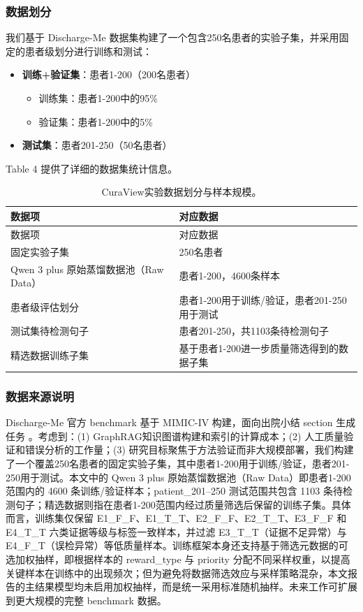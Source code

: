 \documentclass[11pt]{article}
\begin{document}
\subsubsection{数据划分}

我们基于 Discharge-Me 数据集构建了一个包含250名患者的实验子集，并采用固定的患者级划分进行训练和测试：

\begin{itemize}
\item
  \textbf{训练+验证集}：患者1-200（200名患者）

  \begin{itemize}
  \item
    训练集：患者1-200中的95\%
  \item
    验证集：患者1-200中的5\%
  \end{itemize}
\item
  \textbf{测试集}：患者201-250（50名患者）
\end{itemize}

Table 4 提供了详细的数据集统计信息。

\begin{longtable}[]{@{}ll@{}}
\caption{CuraView实验数据划分与样本规模。}\tabularnewline
\toprule\noalign{}
数据项 & 对应数据 \\
\midrule\noalign{}
\endfirsthead
\toprule\noalign{}
数据项 & 对应数据 \\
\midrule\noalign{}
\endhead
\bottomrule\noalign{}
\endlastfoot
固定实验子集 & 250名患者 \\
Qwen 3 plus 原始蒸馏数据池（Raw Data） & 患者1-200，4600条样本 \\
患者级评估划分 & 患者1-200用于训练/验证，患者201-250用于测试 \\
测试集待检测句子 & 患者201-250，共1103条待检测句子 \\
精选数据训练子集 & 基于患者1-200进一步质量筛选得到的数据子集 \\
\end{longtable}

\subsubsection{数据来源说明}

Discharge-Me 官方 benchmark 基于 MIMIC-IV 构建，面向出院小结 section 生成任务 \citep{stanfordaimi2024dischargeMe,xu2024dischargeMeSharedTask}。考虑到：(1) GraphRAG知识图谱构建和索引的计算成本；(2) 人工质量验证和错误分析的工作量；(3) 研究目标聚焦于方法验证而非大规模部署，我们构建了一个覆盖250名患者的固定实验子集，其中患者1-200用于训练/验证，患者201-250用于测试。本文中的 Qwen 3 plus 原始蒸馏数据池（Raw Data）即患者1-200范围内的 4600 条训练/验证样本；patient\_201--250 测试范围共包含 1103 条待检测句子；精选数据则指在患者1-200范围内经过质量筛选后保留的训练子集。具体而言，训练集仅保留 E1\_F\_F、E1\_T\_T、E2\_F\_F、E2\_T\_T、E3\_F\_F 和 E4\_T\_T 六类证据等级与标签一致样本，并过滤 E3\_T\_T（证据不足异常）与 E4\_F\_T（误检异常）等低质量样本。训练框架本身还支持基于筛选元数据的可选加权抽样，即根据样本的 reward\_type 与 priority 分配不同采样权重，以提高关键样本在训练中的出现频次；但为避免将数据筛选效应与采样策略混杂，本文报告的主结果模型均未启用加权抽样，而是统一采用标准随机抽样。未来工作可扩展到更大规模的完整 benchmark 数据。
\end{document}
